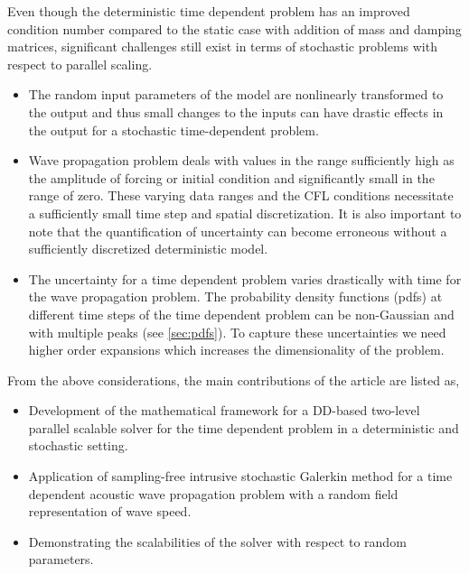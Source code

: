 \documentclass{article}
\begin{document}
\textcolor{ss}{Even though the deterministic time dependent problem has an improved condition number compared to the static case with addition of mass and damping matrices, significant challenges still exist in terms of stochastic problems with respect to parallel scaling.}

\begin{itemize}
\item[1.] \textcolor{ss}{The random input parameters of the model are nonlinearly transformed to the output and thus small changes to the inputs can have drastic effects in the output for a stochastic time-dependent problem.}

\item[2.] \textcolor{ss}{Wave propagation problem deals with values in the range sufficiently high as the amplitude of forcing or initial condition and significantly small in the range of zero. These varying data ranges and the CFL conditions necessitate a sufficiently small time step and spatial discretization. It is also important to note that the quantification of uncertainty can become erroneous without a sufficiently discretized deterministic model.}

\item[3.] \textcolor{ss}{The uncertainty for a time dependent problem varies drastically with time for the wave propagation problem. The probability density functions (pdfs) at different time steps of the time dependent problem can be non-Gaussian and with multiple peaks (see \ref{sec:pdfs}).
To capture these uncertainties we need higher order expansions which increases the dimensionality of the problem.}
\end{itemize}



From the above considerations, the main contributions of the article are listed as,

\begin{itemize}
\item[1.] \textcolor{ss}{Development of the mathematical framework for a DD-based two-level parallel scalable solver for the time dependent problem in a deterministic and stochastic setting.}
\item[2.] \textcolor{ss}{Application of sampling-free intrusive stochastic Galerkin method for a time dependent acoustic wave propagation problem with a random field representation of wave speed.}
\item[3.] \textcolor{ss}{Demonstrating the scalabilities of the solver with respect to random parameters.}
\end{itemize}
\end{document}
